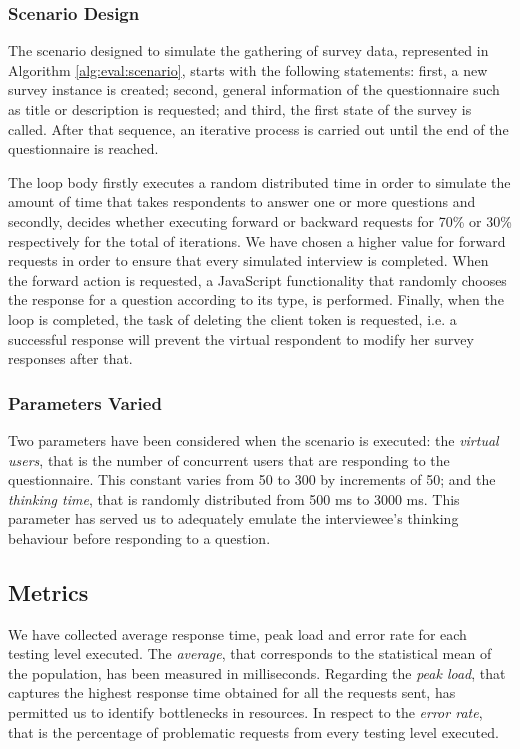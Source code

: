 		\subsubsection{Scenario Design}
		The scenario designed to simulate the gathering of survey data, represented in Algorithm \ref{alg:eval:scenario}, starts with the following statements: first, a new survey instance is created; second, general information of the questionnaire such as title or description is requested; and third, the first state of the survey is called. After that sequence, an iterative process is carried out until the end of the questionnaire is reached.

		

		The loop body firstly executes a random distributed time in order to simulate the amount of time that takes respondents to answer one or more questions and secondly, decides whether executing forward or backward requests for 70\% or 30\% respectively for the total of iterations. We have chosen a higher value for forward requests in order to ensure that every simulated interview is completed. When the forward action is requested, a JavaScript functionality that randomly chooses the response for a question according to its type, is performed. Finally, when the loop is completed, the task of deleting the client token is requested, i.e. a successful response will prevent the virtual respondent to modify her survey responses after that. %

		\subsubsection{Parameters Varied}

		Two parameters have been considered when the scenario is executed: the \emph{virtual users}, that is the number of concurrent users that are responding to the questionnaire. This constant varies from 50 to 300 by increments of 50; and the \emph{thinking time}, that is randomly distributed from 500 ms to 3000 ms. This parameter has served us to adequately emulate the interviewee's thinking behaviour before responding to a question. 

	\subsection{Metrics}

	We have collected average response time, peak load and error rate for each testing level executed. The \emph{average}, that corresponds to the statistical mean of the population, has been measured in milliseconds. Regarding the \emph{peak load}, that captures the highest response time obtained for all the requests sent, has permitted us to identify bottlenecks in resources. In respect to the \emph{error rate}, that is the percentage of problematic requests from every testing level executed.

